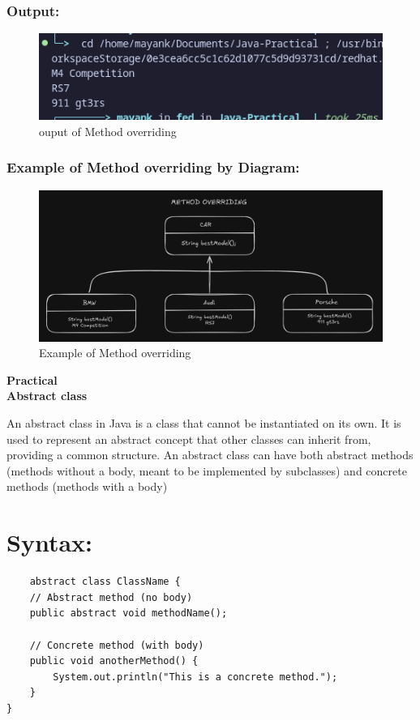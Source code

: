 \documentclass[a4paper,12pt]{article}
\newcounter{practicalno} %
\newcommand{\practicaltitle}[1]{
    \stepcounter{practicalno} %
    \newpage
    \begin{center}
        \vspace{1cm}
        \Large\textbf{Practical \thepracticalno} \\
        \vspace{0.5cm}
        \Large\textbf{#1} %
        \normalsize\vspace{1cm}
    \end{center}
}
\begin{document}
\subsubsection{Output: }
\begin{figure}[H]
    \centering
    \includegraphics[width=0.9\linewidth]{images/MetOvrr.png}
    \caption{ouput of Method overriding}
    \label{fig:sample_image}
\end{figure}

\subsubsection{Example of Method overriding by Diagram: }
\begin{figure}[H]
    \centering
    \includegraphics[width=0.9\linewidth]{images/mETHODdIAGRAM.png}
    \caption{Example of Method overriding}
    \label{fig:sample_image}
\end{figure}

\setcounter{section}{0}

\practicaltitle{Abstract class}
An abstract class in Java is a class that cannot be instantiated on its own. It is used to represent an abstract concept that other classes can inherit from, providing a common structure. An abstract class can have both abstract methods (methods without a body, meant to be implemented by subclasses) and concrete methods (methods with a body)

\section{Syntax: }
\begin{lstlisting}
    abstract class ClassName {
    // Abstract method (no body)
    public abstract void methodName();

    // Concrete method (with body)
    public void anotherMethod() {
        System.out.println("This is a concrete method.");
    }
}
\end{lstlisting}
\end{document}
